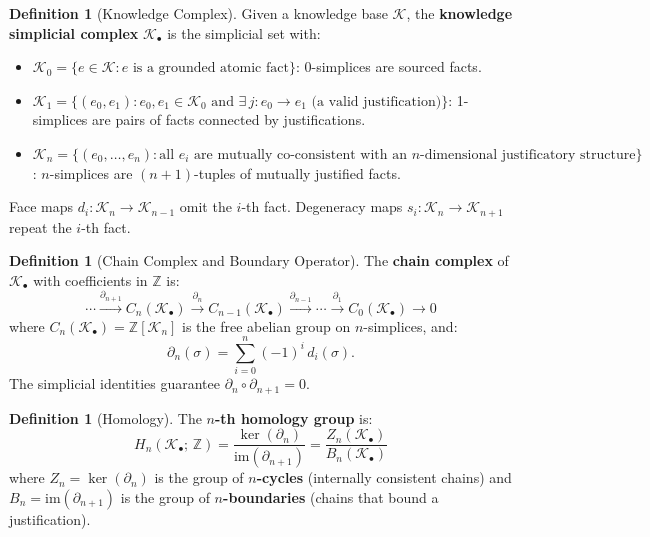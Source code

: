 \documentclass[11pt,a4paper]{article}
\theoremstyle{plain}
\theoremstyle{definition}
\newtheorem{definition}[theorem]{Definition}
\newcommand{\im}{\mathrm{im}}
\begin{document}
\begin{definition}[Knowledge Complex]\label{def:kcomplex}
Given a knowledge base $\mathcal{K}$, the \textbf{knowledge simplicial complex} $\mathcal{K}_\bullet$ is the simplicial set with:
\begin{itemize}[nosep]
  \item $\mathcal{K}_0 = \{e \in \mathcal{K} : e \text{ is a grounded atomic fact}\}$: 0-simplices are sourced facts.
  \item $\mathcal{K}_1 = \{(e_0, e_1) : e_0, e_1 \in \mathcal{K}_0 \text{ and } \exists\, j\colon e_0 \to e_1 \text{ (a valid justification)}\}$: 1-simplices are pairs of facts connected by justifications.
  \item $\mathcal{K}_n = \{(e_0, \ldots, e_n) : \text{all } e_i \text{ are mutually co-consistent with an } n\text{-dimensional justificatory structure}\}$: $n$-simplices are $(n+1)$-tuples of mutually justified facts.
\end{itemize}
Face maps $d_i\colon \mathcal{K}_n \to \mathcal{K}_{n-1}$ omit the $i$-th fact. Degeneracy maps $s_i\colon \mathcal{K}_n \to \mathcal{K}_{n+1}$ repeat the $i$-th fact.
\end{definition}

\begin{definition}[Chain Complex and Boundary Operator]\label{def:chain}
The \textbf{chain complex} of $\mathcal{K}_\bullet$ with coefficients in $\mathbb{Z}$ is:
\[
  \cdots \xrightarrow{\partial_{n+1}} C_n(\mathcal{K}_\bullet) \xrightarrow{\partial_n} C_{n-1}(\mathcal{K}_\bullet) \xrightarrow{\partial_{n-1}} \cdots \xrightarrow{\partial_1} C_0(\mathcal{K}_\bullet) \to 0
\]
where $C_n(\mathcal{K}_\bullet) = \mathbb{Z}[\mathcal{K}_n]$ is the free abelian group on $n$-simplices, and:
\begin{equation}\label{eq:boundary}
  \partial_n(\sigma) = \sum_{i=0}^{n} (-1)^i\, d_i(\sigma).
\end{equation}
The simplicial identities guarantee $\partial_n \circ \partial_{n+1} = 0$.
\end{definition}

\begin{definition}[Homology]\label{def:homology}
The \textbf{$n$-th homology group} is:
\begin{equation}\label{eq:homology}
  H_n(\mathcal{K}_\bullet;\, \mathbb{Z}) = \frac{\ker(\partial_n)}{\im(\partial_{n+1})} = \frac{Z_n(\mathcal{K}_\bullet)}{B_n(\mathcal{K}_\bullet)}
\end{equation}
where $Z_n = \ker(\partial_n)$ is the group of \textbf{$n$-cycles} (internally consistent chains) and $B_n = \im(\partial_{n+1})$ is the group of \textbf{$n$-boundaries} (chains that bound a justification).
\end{definition}
\end{document}
